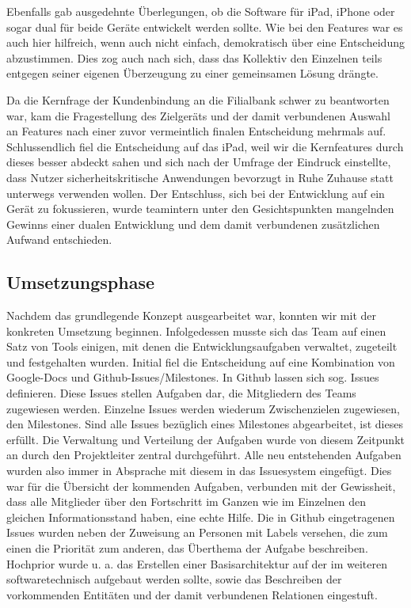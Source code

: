 	Ebenfalls gab ausgedehnte Überlegungen, ob die Software für iPad, iPhone oder sogar dual für beide Geräte entwickelt werden sollte. Wie bei den Features war es auch hier hilfreich, wenn auch nicht einfach, demokratisch über eine Entscheidung abzustimmen. Dies zog auch nach sich, dass das Kollektiv den Einzelnen teils entgegen seiner eigenen Überzeugung zu einer gemeinsamen Lösung drängte. 
	
	Da die Kernfrage der Kundenbindung an die Filialbank schwer zu beantworten war, kam die Fragestellung des Zielgeräts und der damit verbundenen Auswahl an Features nach einer zuvor vermeintlich finalen Entscheidung mehrmals auf. Schlussendlich fiel die Entscheidung auf das iPad, weil wir die Kernfeatures durch dieses besser abdeckt sahen und sich nach der Umfrage der Eindruck einstellte, dass Nutzer sicherheitskritische Anwendungen bevorzugt in Ruhe Zuhause statt unterwegs verwenden wollen. Der Entschluss, sich bei der Entwicklung auf ein Gerät zu fokussieren, wurde teamintern unter den Gesichtspunkten mangelnden Gewinns einer dualen Entwicklung und dem damit verbundenen zusätzlichen Aufwand entschieden.

\subsection{Umsetzungsphase}
	Nachdem das grundlegende Konzept ausgearbeitet war, konnten wir mit der konkreten Umsetzung beginnen. Infolgedessen musste sich das Team auf einen Satz von Tools einigen, mit denen die Entwicklungsaufgaben verwaltet, zugeteilt und festgehalten wurden. Initial fiel die Entscheidung auf eine Kombination von Google-Docs und Github-Issues/Milestones. In Github lassen sich sog. Issues definieren. Diese Issues stellen Aufgaben dar, die Mitgliedern des Teams zugewiesen werden. Einzelne Issues werden wiederum Zwischenzielen zugewiesen, den Milestones. Sind alle Issues bezüglich eines Milestones abgearbeitet, ist dieses erfüllt. Die Verwaltung und Verteilung der Aufgaben wurde von diesem Zeitpunkt an durch den Projektleiter zentral durchgeführt. Alle neu entstehenden Aufgaben wurden also immer in Absprache mit diesem in das Issuesystem eingefügt. Dies war für die Übersicht der kommenden Aufgaben, verbunden mit der Gewissheit, dass alle Mitglieder über den Fortschritt im Ganzen wie im Einzelnen den gleichen Informationsstand haben, eine echte Hilfe. Die in Github eingetragenen Issues wurden neben der Zuweisung an Personen mit Labels versehen, die zum einen die Priorität zum anderen, das Überthema der Aufgabe beschreiben. Hochprior wurde u. a. das Erstellen einer Basisarchitektur auf der im weiteren softwaretechnisch aufgebaut werden sollte, sowie das Beschreiben der vorkommenden Entitäten und der damit verbundenen Relationen eingestuft. 

